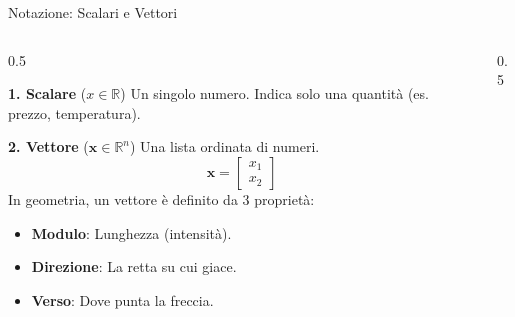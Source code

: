 \documentclass[aspectratio=169, 10pt]{beamer}
\begin{document}
\begin{frame}{Notazione: Scalari e Vettori}

    \begin{columns}[T,onlytextwidth]
        \begin{column}{0.5\textwidth}
            \vspace{0.2em} %
            \begin{block}{\textbf{1. Scalare} ($x \in \mathbb{R}$)}
                \small Un singolo numero. Indica solo una quantità (es. prezzo, temperatura).
            \end{block}

            \vspace{0.8em}

            \begin{block}{\textbf{2. Vettore} ($\mathbf{x} \in \mathbb{R}^n$)}
                \scriptsize Una lista ordinata di numeri.
                \[ \mathbf{x} = \begin{bmatrix} x_1 \\ x_2 \end{bmatrix} \]
                In geometria, un vettore è definito da 3 proprietà:
                \begin{itemize}
                    \item \textbf{Modulo}: Lunghezza (intensità).
                    \item \textbf{Direzione}: La retta su cui giace.
                    \item \textbf{Verso}: Dove punta la freccia.
                \end{itemize}
            \end{block}
        \end{column}

        \begin{column}{0.5\textwidth}
            \centering
            


\end{column}
\end{columns}
\end{frame}
\end{document}
